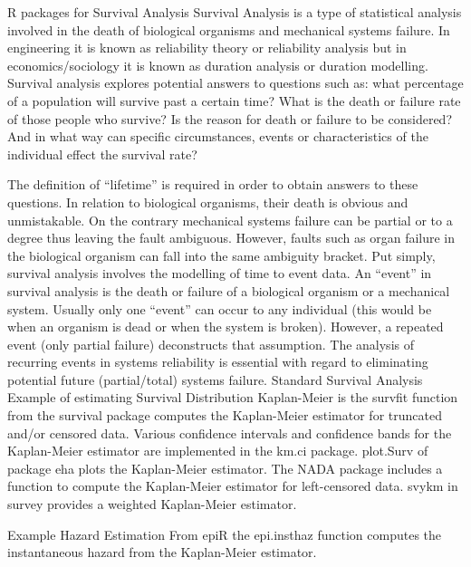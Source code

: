 R packages for Survival Analysis
Survival Analysis is a type of statistical analysis involved in the death of biological organisms and mechanical systems failure. In engineering it is known as reliability theory or reliability analysis but in economics/sociology it is known as duration analysis or duration modelling. Survival analysis explores potential answers to questions such as: what percentage of a population will survive past a certain time? What is the death or failure rate of those people who survive? Is the reason for death or failure to be considered? And in what way can specific circumstances, events or characteristics of the individual effect the survival rate?

The definition of “lifetime” is required in order to obtain answers to these questions. In relation to biological organisms, their death is obvious and unmistakable. On the contrary mechanical systems failure can be partial or to a degree thus leaving the fault ambiguous. However, faults such as organ failure in the biological organism can fall into the same ambiguity bracket. 
Put simply, survival analysis involves the modelling of time to event data. An “event” in survival analysis is the death or failure of a biological organism or a mechanical system. Usually only one “event” can occur to any individual (this would be when an organism is dead or when the system is broken). However, a repeated event (only partial failure) deconstructs that assumption. The analysis of recurring events in systems reliability is essential with regard to eliminating potential future (partial/total) systems failure.
Standard Survival Analysis
Example of estimating Survival Distribution
Kaplan-Meier is the survfit function from the survival package computes the Kaplan-Meier estimator for truncated and/or censored data. Various confidence intervals and confidence bands for the Kaplan-Meier estimator are implemented in the km.ci package. plot.Surv of package eha plots the Kaplan-Meier estimator. The NADA package includes a function to compute the Kaplan-Meier estimator for left-censored data. svykm in survey provides a weighted Kaplan-Meier estimator. 

Example Hazard Estimation
From epiR the epi.insthaz function computes the instantaneous hazard from the Kaplan-Meier estimator. 

